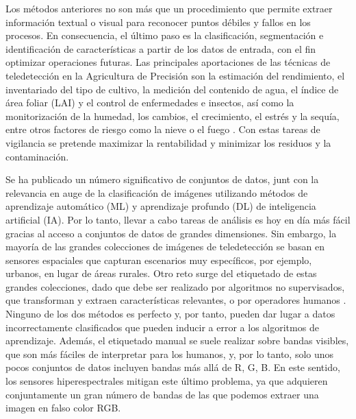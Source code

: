 Los métodos anteriores no son más que un procedimiento que permite extraer información textual o visual para reconocer puntos débiles y fallos en los procesos. En consecuencia, el último paso es la clasificación, segmentación e identificación de características a partir de los datos de entrada, con el fin optimizar operaciones futuras. Las principales aportaciones de las técnicas de teledetección en la Agricultura de Precisión son la estimación del rendimiento, el inventariado del tipo de cultivo, la medición del contenido de agua, el índice de área foliar (LAI) y el control de enfermedades e insectos, así como la monitorización de la humedad, los cambios, el crecimiento, el estrés y la sequía, entre otros factores de riesgo como la nieve o el fuego \cite{huang_agricultural_2018}. Con estas tareas de vigilancia se pretende maximizar la rentabilidad y minimizar los residuos y la contaminación. 

Se ha publicado un número significativo de conjuntos de datos, junt con la relevancia en auge de la clasificación de imágenes utilizando métodos de aprendizaje automático (ML) y aprendizaje profundo (DL) de inteligencia artificial (IA). Por lo tanto, llevar a cabo tareas de análisis es hoy en día más fácil gracias al acceso a conjuntos de datos de grandes dimensiones. Sin embargo, la mayoría de las grandes colecciones de imágenes de teledetección se basan en sensores espaciales que capturan escenarios muy específicos, por ejemplo, urbanos, en lugar de áreas rurales. Otro reto surge del etiquetado de estas grandes colecciones, dado que debe ser realizado por algoritmos no supervisados, que transforman y extraen características relevantes, o por operadores humanos \cite{li_image_2021, basu_deepsat_2015}. Ninguno de los dos métodos es perfecto y, por tanto, pueden dar lugar a datos incorrectamente clasificados que pueden inducir a error a los algoritmos de aprendizaje. Además, el etiquetado manual se suele realizar sobre bandas visibles, que son más fáciles de interpretar para los humanos, y, por lo tanto, solo unos pocos conjuntos de datos incluyen bandas más allá de R, G, B. En este sentido, los sensores hiperespectrales mitigan este último problema, ya que adquieren conjuntamente un gran número de bandas de las que podemos extraer una imagen en falso color RGB.

